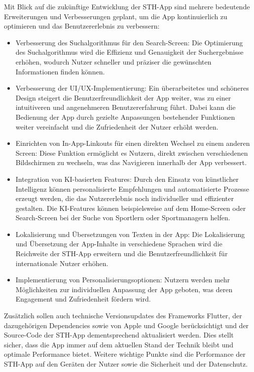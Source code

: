 Mit Blick auf die zukünftige Entwicklung der STH-App sind mehrere bedeutende Erweiterungen und Verbesserungen geplant, um die App kontinuierlich zu optimieren und das Benutzererlebnis zu verbessern:

\begin{itemize}
\item Verbesserung des Suchalgorithmus für den Search-Screen: Die Optimierung des Suchalgorithmus wird die Effizienz und Genauigkeit der Suchergebnisse erhöhen, wodurch Nutzer schneller und präziser die gewünschten Informationen finden können.
\item Verbesserung der UI/UX-Implementierung: Ein überarbeitetes und schöneres Design steigert die Benutzerfreundlichkeit der App weiter, was zu einer intuitiveren und angenehmeren Benutzererfahrung führt. Dabei kann die Bedienung der App durch gezielte Anpassungen bestehender Funktionen weiter vereinfacht und die Zufriedenheit der Nutzer erhöht werden.
\item Einrichten von In-App-Linkouts für einen direkten Wechsel zu einem anderen Screen: Diese Funktion ermöglicht es Nutzern, direkt zwischen verschiedenen Bildschirmen zu wechseln, was das Navigieren innerhalb der App verbessert.
\item Integration von KI-basierten Features: Durch den Einsatz von künstlicher Intelligenz können personalisierte Empfehlungen und automatisierte Prozesse erzeugt werden, die das Nutzererlebnis noch individueller und effizienter gestalten. Die KI-Features können beispielsweise auf dem Home-Screen oder Search-Screen bei der Suche von Sportlern oder Sportmanagern helfen.
\item Lokalisierung und Übersetzungen von Texten in der App: Die Lokalisierung und Übersetzung der App-Inhalte in verschiedene Sprachen wird die Reichweite der STH-App erweitern und die Benutzerfreundlichkeit für internationale Nutzer erhöhen.
\item Implementierung von Personalisierungsoptionen: Nutzern werden mehr Möglichkeiten zur individuellen Anpassung der App geboten, was deren Engagement und Zufriedenheit fördern wird.
\end{itemize}
Zusätzlich sollen auch technische Versionsupdates des Frameworks Flutter, der dazugehörigen Dependencies sowie von Apple und Google berücksichtigt und der Source-Code der STH-App dementsprechend aktualisiert werden. Dies stellt sicher, dass die App immer auf dem aktuellen Stand der Technik bleibt und optimale Performance bietet.
Weitere wichtige Punkte sind die Performance der STH-App auf den Geräten der Nutzer sowie die Sicherheit und der Datenschutz. 
